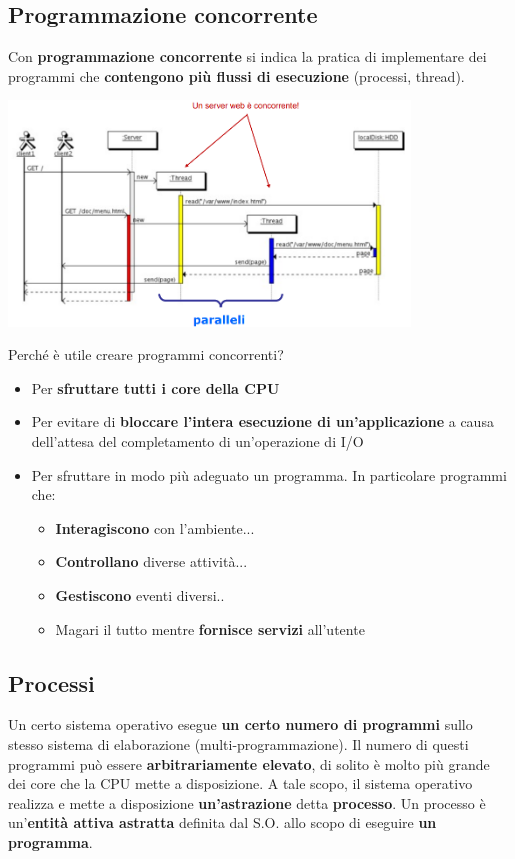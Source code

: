 \documentclass[12pt]{article}
\begin{document}
\subsection{Programmazione concorrente}
Con \textbf{programmazione concorrente} si indica la pratica di implementare dei programmi che \textbf{contengono più flussi di esecuzione} (processi, thread).
\begin{center}
    \includegraphics[width = 0.80\textwidth]{Images/50.PNG}
\end{center}
Perché è utile creare programmi concorrenti?
\begin{itemize}
    \item Per \textbf{sfruttare tutti i core della CPU}
    \item Per evitare di \textbf{bloccare l'intera esecuzione di un'applicazione} a causa dell'attesa del completamento di un'operazione di I/O
    \item Per sfruttare in modo più adeguato un programma. In particolare programmi che:
          \begin{itemize}
              \item \textbf{Interagiscono} con l'ambiente...
              \item \textbf{Controllano} diverse attività...
              \item \textbf{Gestiscono} eventi diversi..
              \item Magari il tutto mentre \textbf{fornisce servizi} all'utente
          \end{itemize}
\end{itemize}
\subsection{Processi}
Un certo sistema operativo esegue \textbf{un certo numero di programmi} sullo stesso sistema di elaborazione (multi-programmazione). Il numero di questi programmi può essere \textbf{arbitrariamente elevato}, di solito è molto più grande dei core che la CPU mette a disposizione. A tale scopo, il sistema operativo realizza e mette a disposizione \textbf{un'astrazione} detta \textbf{processo}. Un processo è un'\textbf{entità attiva astratta} definita dal S.O. allo scopo di eseguire \textbf{un programma}.
\end{document}
